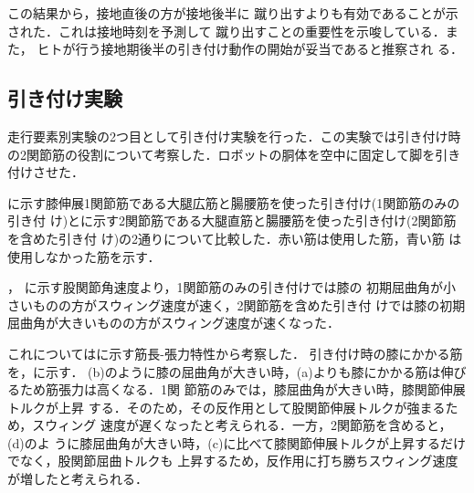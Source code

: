 \documentclass[10pt,a4paper]{jsarticle}
\begin{document}
この結果から，接地直後の方が接地後半に
蹴り出すよりも有効であることが示された．これは接地時刻を予測して
蹴り出すことの重要性を示唆している．また，
ヒトが行う接地期後半の引き付け動作の開始が妥当であると推察され
る．





\vspace{-3mm}
\subsection{引き付け実験}

走行要素別実験の2つ目として引き付け実験を行った．この実験では引き付け時
の2関節筋の役割について考察した．ロボットの胴体を空中に固定して脚を引き
付けさせた．

に示す膝伸展1関節筋である大腿広筋と腸腰筋を使った引き付け(1関節筋のみの引き付
け)とに示す2関節筋である大腿直筋と腸腰筋を使った引き付け(2関節筋を含めた引き付
け)の2通りについて比較した．赤い筋は使用した筋，青い筋
は使用しなかった筋を示す．

，
に示す股関節角速度より，1関節筋のみの引き付けでは膝の
初期屈曲角が小さいものの方がスウィング速度が速く，2関節筋を含めた引き付
けでは膝の初期屈曲角が大きいものの方がスウィング速度が速くなった．

これについてはに示す筋長-張力特性から考察した．
引き付け時の膝にかかる筋を，に示す．
(b)のように膝の屈曲角が大きい時，(a)よりも膝にかかる筋は伸びるため筋張力は高くなる．1関
節筋のみでは，膝屈曲角が大きい時，膝関節伸展トルクが上昇
する．そのため，その反作用として股関節伸展トルクが強まるため，スウィング
速度が遅くなったと考えられる．一方，2関節筋を含めると，(d)のよ
うに膝屈曲角が大きい時，(c)に比べて膝関節伸展トルクが上昇するだけでなく，股関節屈曲トルクも
上昇するため，反作用に打ち勝ちスウィング速度が増したと考えられる．
\end{document}
